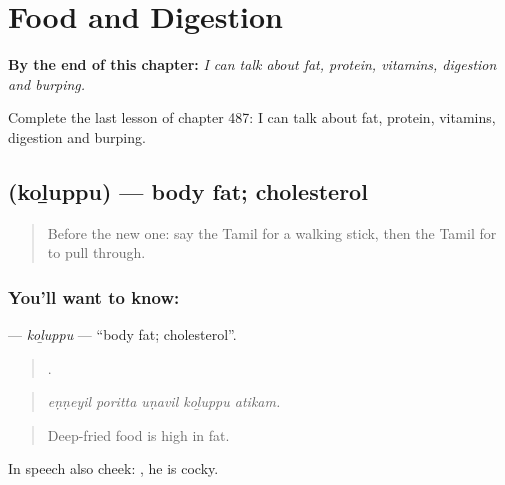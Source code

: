 
\chapter{Food and Digestion}
\label{ch:ta-food-and-digestion}

\begin{chapteropening}
\textbf{By the end of this chapter:} \emph{I can talk about fat, protein, vitamins, digestion and burping.}

Complete the last lesson of chapter 487: I can talk about fat, protein, vitamins, digestion and burping.
\end{chapteropening}

\section[\texorpdfstring{\ta{கொழுப்பு} (koḻuppu)}{கொழுப்பு (koḻuppu)}]{ (koḻuppu) — body fat; cholesterol}

\label{lesson:TA-C487-koluppu}



\begin{quote}
Before the new one: say the Tamil for a walking stick, then the Tamil for to pull through.
\end{quote}

\subsection*{You'll want to know: }
\textbf{} — \emph{koḻuppu} — \textquotedblleft{}body fat; cholesterol\textquotedblright{}.

\begin{quote}
    .
\end{quote}

\begin{quote}
\emph{eṇṇeyil poritta uṇavil koḻuppu atikam.}
\end{quote}

\begin{quote}
Deep-fried food is high in fat.
\end{quote}

In speech also cheek:  , he is cocky.

